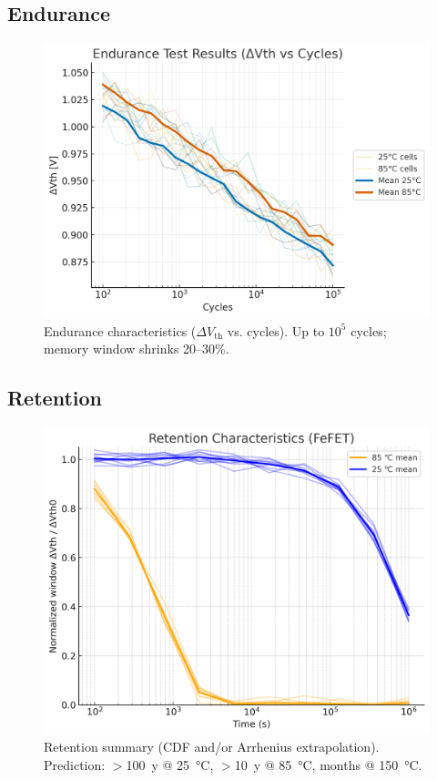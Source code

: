\documentclass[conference]{IEEEtran}
\begin{document}
\subsection{Endurance}
\begin{figure}[!t]
  \centering
  \includegraphics[width=0.95\linewidth]{figures/fig5_endurance.png}
  \caption{Endurance characteristics ($\Delta V_{\mathrm{th}}$ vs. cycles). Up to $10^5$ cycles; memory window shrinks 20--30\%.}
  \label{fig:endurance}
\end{figure}

\subsection{Retention}
\begin{figure}[!t]
  \centering
  \includegraphics[width=0.95\linewidth]{figures/fig6_retention.png}
  \caption{Retention summary (CDF and/or Arrhenius extrapolation). Prediction: $>$100~y @ \SI{25}{\celsius}, $>$10~y @ \SI{85}{\celsius}, months @ \SI{150}{\celsius}.}
  \label{fig:retention}
\end{figure}
\end{document}
